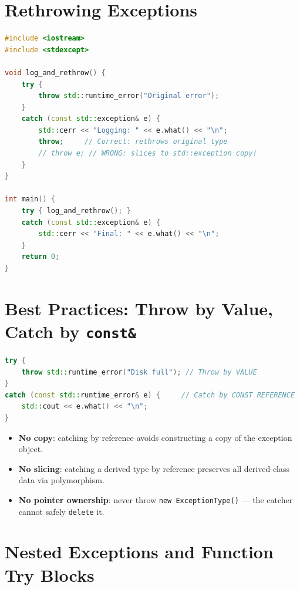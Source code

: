 \section{Rethrowing Exceptions}
\label{sec:rethrow}

\begin{lstlisting}[language=C++, caption={Correct rethrow preserves dynamic type}]
#include <iostream>
#include <stdexcept>

void log_and_rethrow() {
    try {
        throw std::runtime_error("Original error");
    }
    catch (const std::exception& e) {
        std::cerr << "Logging: " << e.what() << "\n";
        throw;     // Correct: rethrows original type
        // throw e; // WRONG: slices to std::exception copy!
    }
}

int main() {
    try { log_and_rethrow(); }
    catch (const std::exception& e) {
        std::cerr << "Final: " << e.what() << "\n";
    }
    return 0;
}
\end{lstlisting}

\section{Best Practices: Throw by Value, Catch by \texttt{const\&}}
\label{sec:throw-catch-rules}

\begin{lstlisting}[language=C++, caption={Correct throw/catch pattern}]
try {
    throw std::runtime_error("Disk full"); // Throw by VALUE
}
catch (const std::runtime_error& e) {     // Catch by CONST REFERENCE
    std::cout << e.what() << "\n";
}
\end{lstlisting}

\begin{itemize}
    \item \textbf{No copy}: catching by reference avoids constructing a copy of the exception object.
    \item \textbf{No slicing}: catching a derived type by reference preserves all derived-class data via polymorphism.
    \item \textbf{No pointer ownership}: never throw \texttt{new ExceptionType()} --- the catcher cannot safely \texttt{delete} it.
\end{itemize}

\section{Nested Exceptions and Function Try Blocks}
\label{sec:nested-exceptions}

